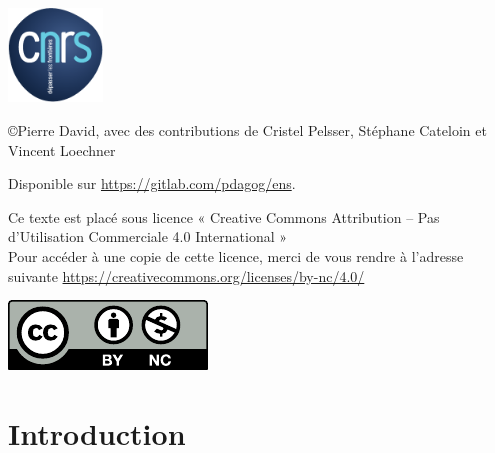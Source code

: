 \documentclass [twoside,openright,a4paper,11pt,french] {report}
\begin{document}
\begin{center}
    \includegraphics [height=2.5cm] {logo-entreprise.pdf}       

    \vfill
    \begin {center}
	\tiny
	\copyright Pierre David,
	avec des contributions de 
	Cristel Pelsser, Stéphane Cateloin et Vincent Loechner

	Disponible sur \url {https://gitlab.com/pdagog/ens}.

        Ce texte est placé sous licence « Creative Commons Attribution
	-- Pas d’Utilisation Commerciale 4.0 International » \\
	Pour accéder à une copie de cette licence,
	merci de vous rendre à l'adresse suivante
	\url {https://creativecommons.org/licenses/by-nc/4.0/}

	\includegraphics [scale=.5] {by-nc}
    \end {center}


\end{center}



{
    \parskip=0pt
    \tableofcontents
}

\cleardoublepage


\chapter {Introduction}
    \label {chap:intro}
\end{document}

